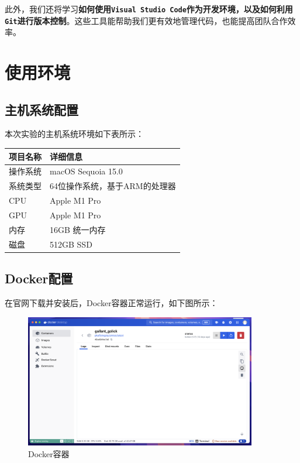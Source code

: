 \documentclass{article}
\begin{document}
此外，我们还将学习\textbf{如何使用\texttt{Visual Studio Code}作为开发环境，以及如何利用\texttt{Git}进行版本控制}。这些工具能帮助我们更有效地管理代码，也能提高团队合作效率。

\section{使用环境}

\subsection{主机系统配置}

本次实验的主机系统环境如下表所示：

\begin{center}
	\begin{tabular}{| >{\centering\arraybackslash}m{3cm} | >{\centering\arraybackslash}m{7cm} |}    
		\hline  
		\textbf{项目名称} & \textbf{详细信息} \\
		\hline  
		操作系统 & macOS Sequoia 15.0 \\  
		\hline  
		系统类型 & 64位操作系统，基于ARM的处理器 \\  
		\hline
		CPU & Apple M1 Pro \\  
		\hline 
		GPU & Apple M1 Pro\\  
		\hline 
		内存 & 16GB 统一内存 \\  
		\hline 
		磁盘 & 512GB SSD \\  
		\hline 		
	\end{tabular}
\end{center}

\subsection{Docker配置}

在官网下载并安装后，Docker容器正常运行，如下图所示：

\begin{figure}[H]
	\centering
	\includegraphics[width=0.9\textwidth]{img/docker_install.png}
	\caption{Docker容器}
\end{figure}
\end{document}

